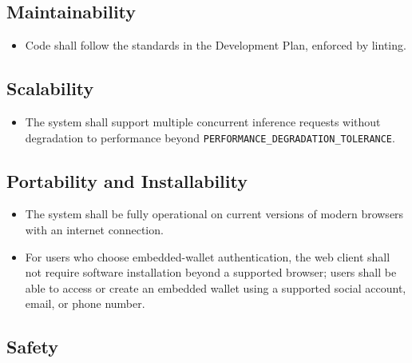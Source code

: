 \documentclass[12pt]{article}
\newcounter{nfrnum} %
\begin{document}
\subsection{Maintainability}

\noindent \begin{itemize}

\item[NFR\refstepcounter{nfrnum}\thenfrnum \label{NFR_CodingStandards}:] Code shall follow the standards in the Development Plan, enforced by linting.

\end{itemize}

\subsection{Scalability}

\noindent \begin{itemize}

\item[NFR\refstepcounter{nfrnum}\thenfrnum \label{NFR_ConcurrentRequests}:] The system shall support multiple concurrent inference requests without degradation to performance beyond \texttt{PERFORMANCE\_DEGRADATION\_TOLERANCE}.

\end{itemize}

\subsection{Portability and Installability}

\noindent \begin{itemize}

\item[NFR\refstepcounter{nfrnum}\thenfrnum \label{NFR_BrowserSupport}:] The system shall be fully operational on current versions of modern browsers with an internet connection.

\item[NFR\refstepcounter{nfrnum}\thenfrnum \label{NFR_NoExtraSoftware}:] For users who choose embedded-wallet authentication, the web client shall not require software installation beyond a supported browser; users shall be able to access or create an embedded wallet using a supported social account, email, or phone number.

\end{itemize}

\subsection{Safety}
\end{document}
